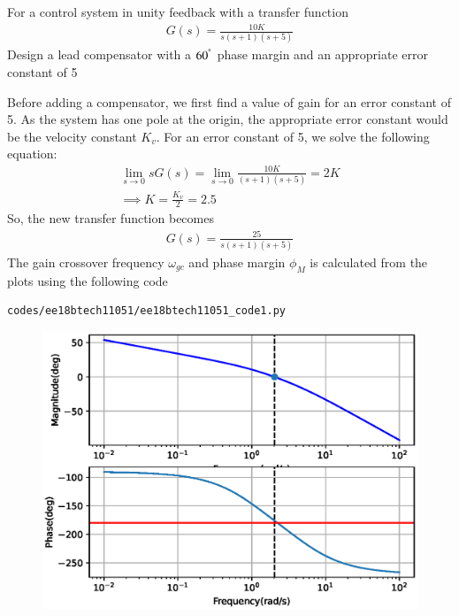 
\item

For a control system in unity feedback with a transfer function
\begin{align}
    G(s) = \frac{10K}{s(s+1)(s+5)}
\end{align}
Design a lead compensator with a $60^{\degree}$ phase margin and an appropriate error constant of 5

\solution
Before adding a compensator, we first find a value of gain for an error constant of 5. As the system has one pole at the origin, the appropriate error constant would be the velocity constant $K_{v}$. For an error constant of 5, we solve the following equation:
\begin{align}
    \lim_{s \to 0} s G(s) = \lim_{s \to 0} \frac{10K}{(s+1)(s+5)} = 2K\\
    \implies K = \frac{K_{v}}{2} = 2.5
\end{align}
So, the new transfer function becomes
\begin{align}
    G(s) = \frac{25}{s(s+1)(s+5)}
\end{align}
The gain crossover frequency $ \omega_{gc} $ and phase margin $ \phi_{M} $ is calculated from the plots using the following code
\begin{lstlisting}
codes/ee18btech11051/ee18btech11051_code1.py
\end{lstlisting}

\begin{figure}[!ht]
    \centering
    \includegraphics[width=\columnwidth]{./figs/ee18btech11051/ee18btech11051_fig1.eps}
    \label{fig:ee18btech11051_1}
\end{figure}

